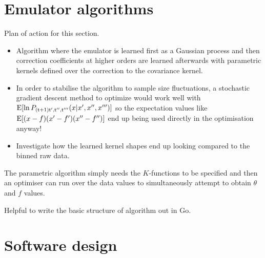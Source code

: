 \section{\sffamily Emulator algorithms}

Plan of action for this section.
\begin{itemize}
\item{Algorithm where the emulator is learned first as a Gaussian process and then correction coefficients at higher orders are learned afterwards with parametric kernels defined over the correction to the covariance kernel.}
\item{In order to stabilise the algorithm to sample size fluctuations, a stochastic gradient descent method to optimize would work well with ${\rm E}[\ln P_{({\sf t}+1){\sf t}',{\sf t}'',{\sf t}'''}(x\vert x', x'', x''')]$ so the expectation values like ${\rm E}[(x-f)(x'-f')(x''-f'')]$ end up being used directly in the optimisation anyway!}
\item{Investigate how the learned kernel shapes end up looking compared to the binned raw data.}
\end{itemize}

The parametric algorithm simply needs the $K$-functions to be specified and then an optimiser can run over the data values to simultaneously attempt to obtain $\theta$ and $f$ values. 

Helpful to write the basic structure of algorithm out in Go.

\section{\sffamily Software design}

